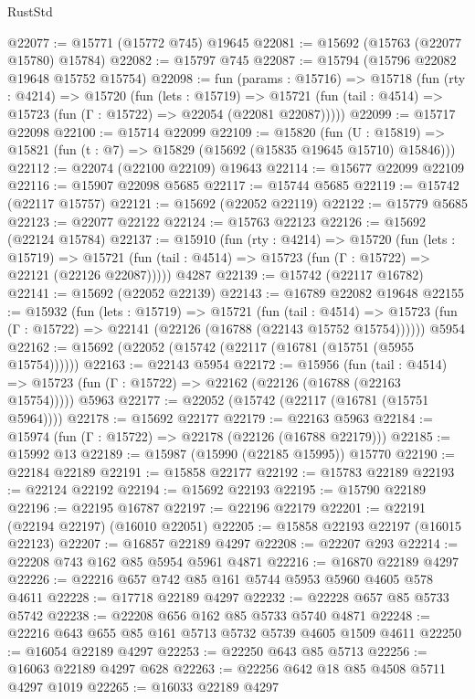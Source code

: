 \begin{lexlean}{RustStd}
\begin{coremodule}
@22077 := @15771 (@15772 @745) @19645
@22081 := @15692 (@15763 (@22077 @15780) @15784)
@22082 := @15797 @745
@22087 := @15794 (@15796 @22082 @19648 @15752 @15754)
@22098 := fun (params : @15716) =>
  @15718
    (fun (rty : @4214) =>
    @15720
      (fun (lets : @15719) =>
      @15721 (fun (tail : @4514) => @15723 (fun (Γ : @15722) => @22054 (@22081 @22087)))))
@22099 := @15717 @22098
@22100 := @15714 @22099
@22109 := @15820
    (fun (U : @15819) => @15821 (fun (t : @7) => @15829 (@15692 (@15835 @19645 @15710) @15846)))
@22112 := @22074 (@22100 @22109) @19643
@22114 := @15677 @22099 @22109
@22116 := @15907 @22098 @5685
@22117 := @15744 @5685
@22119 := @15742 (@22117 @15757)
@22121 := @15692 (@22052 @22119)
@22122 := @15779 @5685
@22123 := @22077 @22122
@22124 := @15763 @22123
@22126 := @15692 (@22124 @15784)
@22137 := @15910
    (fun (rty : @4214) =>
    @15720
      (fun (lets : @15719) =>
      @15721 (fun (tail : @4514) => @15723 (fun (Γ : @15722) => @22121 (@22126 @22087)))))
    @4287
@22139 := @15742 (@22117 @16782)
@22141 := @15692 (@22052 @22139)
@22143 := @16789 @22082 @19648
@22155 := @15932
    (fun (lets : @15719) =>
    @15721
      (fun (tail : @4514) =>
      @15723 (fun (Γ : @15722) => @22141 (@22126 (@16788 (@22143 @15752 @15754))))))
    @5954
@22162 := @15692 (@22052 (@15742 (@22117 (@16781 (@15751 (@5955 @15754))))))
@22163 := @22143 @5954
@22172 := @15956
    (fun (tail : @4514) => @15723 (fun (Γ : @15722) => @22162 (@22126 (@16788 (@22163 @15754)))))
    @5963
@22177 := @22052 (@15742 (@22117 (@16781 (@15751 @5964))))
@22178 := @15692 @22177
@22179 := @22163 @5963
@22184 := @15974 (fun (Γ : @15722) => @22178 (@22126 (@16788 @22179)))
@22185 := @15992 @13
@22189 := @15987 (@15990 (@22185 @15995)) @15770
@22190 := @22184 @22189
@22191 := @15858 @22177
@22192 := @15783 @22189
@22193 := @22124 @22192
@22194 := @15692 @22193
@22195 := @15790 @22189
@22196 := @22195 @16787
@22197 := @22196 @22179
@22201 := @22191 (@22194 @22197) (@16010 @22051)
@22205 := @15858 @22193 @22197 (@16015 @22123)
@22207 := @16857 @22189 @4297
@22208 := @22207 @293
@22214 := @22208 @743 @162 @85 @5954 @5961 @4871
@22216 := @16870 @22189 @4297
@22226 := @22216 @657 @742 @85 @161 @5744 @5953 @5960 @4605 @578 @4611
@22228 := @17718 @22189 @4297
@22232 := @22228 @657 @85 @5733 @5742
@22238 := @22208 @656 @162 @85 @5733 @5740 @4871
@22248 := @22216 @643 @655 @85 @161 @5713 @5732 @5739 @4605 @1509 @4611
@22250 := @16054 @22189 @4297
@22253 := @22250 @643 @85 @5713
@22256 := @16063 @22189 @4297 @628
@22263 := @22256 @642 @18 @85 @4508 @5711 @4297 @1019
@22265 := @16033 @22189 @4297

\end{coremodule}
\end{lexlean}
